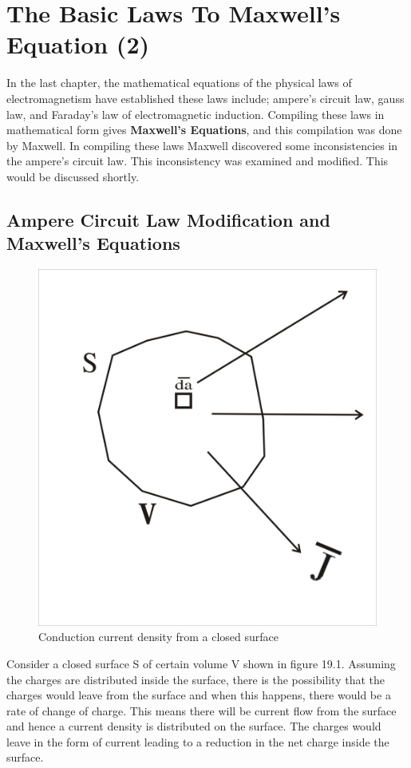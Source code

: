 \chapter{The Basic Laws To Maxwell's Equation (2)}\label{lec:lec19}
In the last chapter, the mathematical equations of the physical laws of electromagnetism have established these laws include; ampere's circuit law, gauss law, and Faraday's law of electromagnetic induction. Compiling these laws in mathematical form gives \textbf{Maxwell's Equations}, and this compilation was done by Maxwell. In compiling these laws Maxwell discovered some inconsistencies in the ampere's circuit law. This inconsistency was examined and modified. This would be discussed shortly.

\section{Ampere Circuit Law Modification and Maxwell's Equations}
\begin{figure}[h]
\centering
\includegraphics[width=.7\linewidth]{./graphics/closedsurface}
\caption{Conduction current density from a closed surface}
\end{figure}

Consider a closed surface S of certain volume V shown in figure 19.1. Assuming the charges are distributed inside the surface, there is the possibility that the charges would leave from the surface and when this happens, there would be a rate of change of charge. This means there will be current flow from the surface and hence a current density is distributed on the surface. The charges would leave in the form of current leading to a reduction in the net charge inside the surface.

